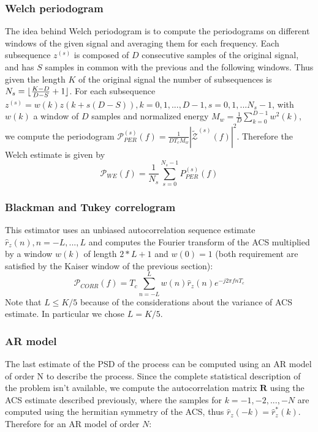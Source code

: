 \documentclass[10pt]{article}
\DeclarePairedDelimiter{\floor}{\lfloor}{\rfloor}
\begin{document}
\subsubsection*{Welch periodogram}
The idea behind Welch periodogram is to compute the periodograms on different windows of the given signal and averaging them for each frequency. Each subsequence $z^{(s)}$ is composed of $D$ consecutive samples of the original signal, and has $S$ samples in common with the previous and the following windows. Thus given the length $K$ of the original signal the number of subsequences is $N_s = \floor{\frac{K - D}{D - S} + 1}$. For each subsequence $z^{(s)} = w(k)z(k + s(D-S)), k=0,1,..., D- 1, s = 0, 1, ... N_s - 1$, with $w(k)$ a window of $D$ samples and normalized energy $M_w = \frac{1}{D}\sum_{k=0}^{D-1}w^2(k)$, we compute the periodogram $\mathcal{P}_{PER}^{(s)}(f) = \frac{1}{D T_c M_w} |\mathcal{\tilde{Z}}^{(s)}(f)|^2$.
Therefore the Welch estimate is given by
\begin{equation}
  \mathcal{P}_{WE}(f) = \frac{1}{N_s}\sum_{s=0}^{N_s-1}{P}_{PER}^{(s)}(f)
\end{equation}


\subsubsection*{Blackman and Tukey correlogram}
This estimator uses an unbiased autocorrelation sequence estimate ${\hat{r}_z(n)}, n = -L, ..., L$ and computes the Fourier transform of the ACS multiplied by a window $w(k)$ of length $2*L + 1$ and $w(0)=1$ (both requirement are satisfied by the Kaiser window of the previous section):
\begin{equation}
  \mathcal{P}_{CORR}(f) = T_c\sum_{n=-L}^{L}w(n)\hat{r}_z(n)e^{-j2\pi f n T_c}
\end{equation}
Note that $L \le K/5$ because of the considerations about the variance of ACS estimate. In particular we chose $L = K/5$.

\subsubsection*{AR model}
The last estimate of the PSD of the process can be computed using an AR model of order N to describe the process. Since the complete statistical description of the problem isn't available, we compute the autocorrelation matrix $\mathbf{R}$ using the ACS estimate described previously, where the samples for $k=-1, -2, ..., -N$ are computed using the hermitian symmetry of the ACS, thus $\hat{r}_z(-k) = \hat{r}_z^*(k)$.
Therefore for an AR model of order $N$:
\end{document}
